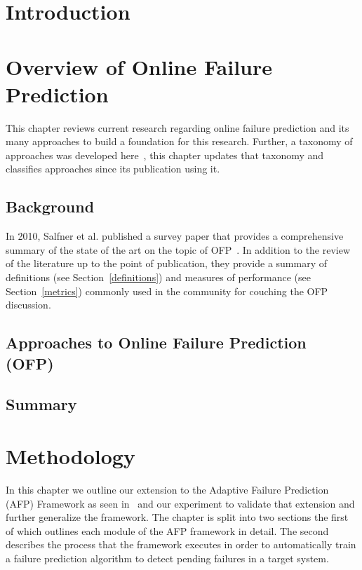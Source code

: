 \documentclass[12pt,letterpaper,oneside]{book}
\begin{document}
\frontmatter
	\flyleaf                        
	\disclaimerpage                 
	\titlepageAFIT                      
	\committeepage  
	
	
	\tableofcontents
	\listoffigures
	\listoftables
\mainmatter

\chapter{Introduction}


\chapter{Overview of Online Failure Prediction} \label{chapter2}
This chapter reviews current research regarding online failure prediction and
its many approaches to build a foundation for this research.  Further, a
taxonomy of approaches was developed here~\cite{salfnerSurvey}, this chapter
updates that taxonomy and classifies approaches since its publication using it.

\section{Background} \label{background}
In 2010, Salfner et al. published a survey paper that provides a comprehensive
summary of the state of the art on the topic of OFP~\cite{salfnerSurvey}.  In
addition to the review of the literature up to the point of publication, they
provide a summary of definitions (see Section~\ref{definitions}) and measures
of performance (see Section~\ref{metrics}) commonly used in the community for
couching the OFP discussion.




\section{Approaches to Online Failure Prediction (OFP)} \label{approaches}





\section{Summary} \label{litReviewSummary}


\chapter{Methodology}
In this chapter we outline our extension to the Adaptive Failure Prediction
(AFP) Framework as seen in~\cite{irrera2015} and our experiment to validate
that extension and further generalize the framework.  The chapter is split into
two sections the first of which outlines each module of the AFP framework in
detail.  The second describes the process that the framework executes in order
to automatically train a failure prediction algorithm to detect pending
failures in a target system.
\end{document}
